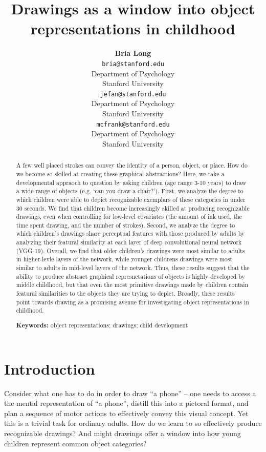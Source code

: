 \documentclass[10pt, letterpaper]{article}
\title{Drawings as a window into object representations in childhood}
\author{{\large \bf Bria Long} \\ \texttt{bria@stanford.edu} \\ Department of Psychology \\ Stanford University \And {\large \bf Judy Fan} \\ \texttt{jefan@stanford.edu} \\ Department of Psychology \\ Stanford University \And {\large \bf Michael C. Frank } \\ \texttt{mcfrank@stanford.edu} \\ Department of Psychology \\ Stanford University}
\begin{document}
\maketitle

\begin{abstract}
A few well placed strokes can convey the identity of a person, object,
or place. How do we become so skilled at creating these graphical
abstractions? Here, we take a developmental appraoch to question by
asking children (age range 3-10 years) to draw a wide range of objects
(e.g. `can you draw a chair?'). First, we analyze the degree to which
children were able to depict recognizable exemplars of these categories
in under 30 seconds. We find that children become increasingly skilled
at producing recognizable drawings, even when controlling for low-level
covariates (the amount of ink used, the time spent drawing, and the
number of strokes). Second, we analyze the degree to which children's
drawings share perceptual features with those produced by adults by
analyzing their featural similarity at each layer of deep convolutional
neural network (VGG-19). Overall, we find that older children's drawings
were most similar to adults in higher-levle layers of the network, while
younger childrens drawings were most similar to adults in mid-level
layers of the network. Thus, these results suggest that the ability to
produce abstract graphical represnetations of objects is highly
developed by middle childhood, but that even the most primitive drawings
made by children contain featural similarities to the objects they are
trying to depict. Broadly, these results point towards drawing as a
promising avenue for investigating object representations in childhood.

\textbf{Keywords:}
object representations; drawings; child development
\end{abstract}

\section{Introduction}\label{introduction}

Consider what one has to do in order to draw ``a phone'' -- one needs to
access a the mental representation of ``a phone'', distill this into a
pictoral format, and plan a sequence of motor actions to effectively
convey this visual concept. Yet this is a trivial task for ordinary
adults. How do we learn to so effectively produce recognizable drawings?
And might drawings offer a window into how young children represent
common object categories?
\end{document}
